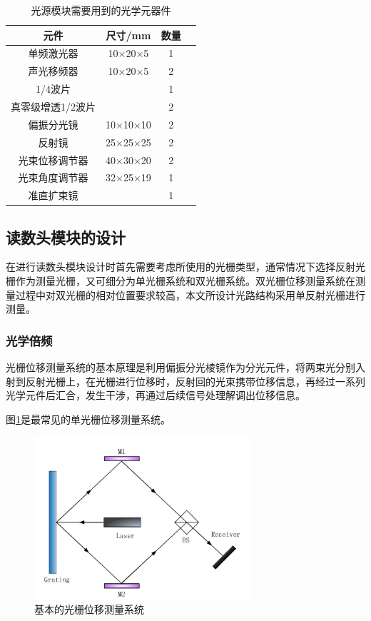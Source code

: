 \documentclass[type=master,oneside]{fduthesis}
\begin{document}
\begin{table}[H]
  \centering
  \caption{光源模块需要用到的光学元器件}
  \label{tab:光源模块需要用到的光学元器件}
  \begin{tabular}{cccc}
    \hline
    元件              & 尺寸/mm  & 数量 \\ \hline
    单频激光器        & 10×20×5  & 1    \\ \hline
    声光移频器        & 10×20×5  & 2    \\ \hline
    1/4波片           &          & 1    \\ \hline
    真零级增透1/2波片 &          & 2    \\ \hline
    偏振分光镜        & 10×10×10 & 2    \\ \hline
    反射镜            & 25×25×25 & 2    \\ \hline
    光束位移调节器    & 40×30×20 & 2    \\ \hline
    光束角度调节器    & 32×25×19 & 1    \\ \hline
    准直扩束镜        &          & 1    \\ \hline
  \end{tabular}
\end{table}


\subsection{读数头模块的设计}
在进行读数头模块设计时首先需要考虑所使用的光栅类型，通常情况下选择反射光栅作为测量光栅，又可细分为单光栅系统和双光栅系统。双光栅位移测量系统在测量过程中对双光栅的相对位置要求较高，本文所设计光路结构采用单反射光栅进行测量。

\subsubsection{光学倍频}
光栅位移测量系统的基本原理是利用偏振分光棱镜作为分光元件，将两束光分别入射到反射光栅上，在光栅进行位移时，反射回的光束携带位移信息，再经过一系列光学元件后汇合，发生干涉，再通过后续信号处理解调出位移信息。

图\ref{fig:基本的光栅位移测量系统}是最常见的单光栅位移测量系统。
\begin{figure}[htb]
  \centering
  \includegraphics[width=8cm]{3-fig//最基本的光栅位移测量系统.png}
  \caption{基本的光栅位移测量系统}
  \label{fig:基本的光栅位移测量系统}
\end{figure}
\end{document}
